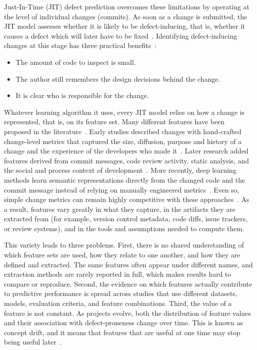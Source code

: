 \documentclass[sigconf,review]{acmart}
\begin{document}
Just-In-Time (JIT) defect prediction overcomes these limitations by operating at the level of individual changes (commits). As soon as a change is submitted, the JIT model assesses whether it is likely to be defect-inducing, that is, whether it causes a defect which will later have to be fixed~\cite{mockus2000predicting, kim2008classifying, kamei2013large}. Identifying defect-inducing changes at this stage has three practical benefits~\cite{kamei2013large}:
\begin{itemize}
    \item The amount of code to inspect is small.
    \item The author still remembers the design decisions behind the change.
    \item It is clear who is responsible for the change.
\end{itemize}

Whatever learning algorithm it uses, every JIT model relies on how a change is represented, that is, on its feature set. Many different features have been proposed in the literature~\cite{kamei2013large, hoang2019deepjit, zhao2023systematic, qiu2025survey, guglielmi2025, ju2025}. Early studies described changes with hand-crafted change-level metrics that captured the size, diffusion, purpose and history of a change and the experience of the developers who made it~\cite{kamei2013large}. Later research added features derived from commit messages, code review activity, static analysis, and the social and process context of development~\cite{guglielmi2025, barzoki2025}. More recently, deep learning methods learn semantic representations directly from the changed code and the commit message instead of relying on manually engineered metrics~\cite{hoang2019deepjit, hoang2020cc2vec, ye2025, jiang2025}. Even so, simple change metrics can remain highly competitive with these approaches~\cite{zeng2021deep}. As a result, features vary greatly in what they capture, in the artifacts they are extracted from (for example, version control metadata, code diffs, issue trackers, or review systems), and in the tools and assumptions needed to compute them.

This variety leads to three problems. First, there is no shared understanding of which feature sets are used, how they relate to one another, and how they are defined and extracted. The same features often appear under different names, and extraction methods are rarely reported in full, which makes results hard to compare or reproduce. Second, the evidence on which features actually contribute to predictive performance is spread across studies that use different datasets, models, evaluation criteria, and feature combinations. Third, the value of a feature is not constant. As projects evolve, both the distribution of feature values and their association with defect-proneness change over time. This is known as concept drift, and it means that features that are useful at one time may stop being useful later~\cite{mcintosh2018fix}.
\end{document}
